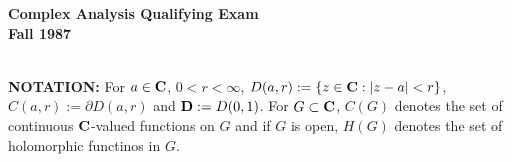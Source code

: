 \documentclass{article}
\begin{document}



\begin{center}\begin{LARGE}
{\bf Complex Analysis Qualifying Exam}\\ 
{\bf Fall 1987}\\ \end{LARGE}
\end{center}
\vspace{0.1in}
\noindent\hrulefill\\

{\bf NOTATION:} For $a \in {\bf C}$, $ 0< r< \infty$,
$D(a,r) := \{z \in {\bf C} : |z-a| < r \}$, $C(a,r) := \partial D(a,r)$ and
${\bf D} := D(0,1)$. For $G \subset {\bf C}$, $C(G)$ denotes the set of continuous
${\bf C}$-valued functions on $G$ and if $G$ is open, $H(G)$ denotes the set of
holomorphic functinos in $G$.
\end{document}
